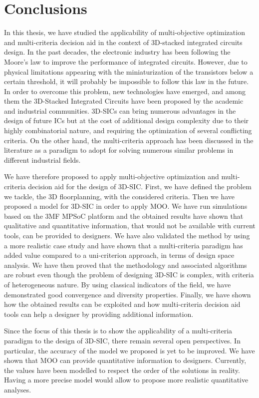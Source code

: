 \chapter{Conclusions}
\label{cha:conclusions}
\fancyhead[RE]{\bfseries\leftmark}

In this thesis, we have studied the applicability of multi-objective optimization and multi-criteria decision aid in the context of 3D-stacked integrated circuits design. In the past decades, the electronic industry has been following the Moore’s law to improve the performance of integrated circuits. However, due to physical limitations appearing with the miniaturization of the transistors below a certain threshold, it will probably be impossible to follow this law in the future. In order to overcome this problem, new technologies have emerged, and among them the 3D-Stacked Integrated Circuits have been proposed by the academic and industrial communities. 3D-SICs can bring numerous advantages in the design of future ICs but at the cost of additional design complexity due to their highly combinatorial nature, and requiring the optimization of several conflicting criteria. On the other hand, the multi-criteria approach has been discussed in the literature as a paradigm to adopt for solving numerous similar problems in different industrial fields.

We have therefore proposed to apply multi-objective optimization and multi-criteria decision aid for the design of 3D-SIC. First, we have defined the problem we tackle, the 3D floorplanning, with the considered criteria. Then we have proposed a model for 3D-SIC in order to apply MOO. We have run simulations based on the 3MF MPSoC platform and the obtained results have shown that qualitative and quantitative information, that would not be available with current tools, can be provided to designers. We have also validated the method by using a more realistic case study and have shown that a multi-criteria paradigm has added value compared to a uni-criterion approach, in terms of design space analysis. We have then proved that the methodology and associated algorithms are robust even though the problem of designing 3D-SIC is complex, with criteria of heterogeneous nature. By using classical indicators of the field, we have demonstrated good convergence and diversity properties. Finally, we have shown how the obtained results can be exploited and how multi-criteria decision aid tools can help a designer by providing additional information.

Since the focus of this thesis is to show the applicability of a multi-criteria paradigm to the design of 3D-SIC, there remain several open perspectives. In particular, the accuracy of the model we proposed is yet to be improved. We have shown that MOO can provide quantitative information to designers. Currently, the values have been modelled to respect the order of the solutions in reality. Having a more precise model would allow to propose more realistic quantitative analyses.

